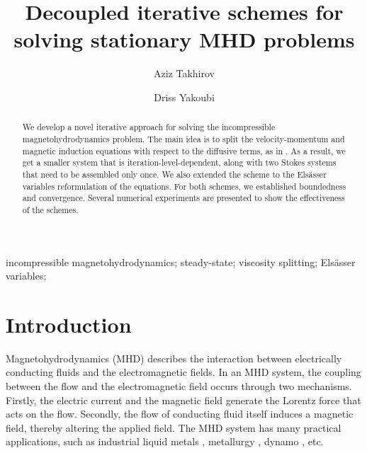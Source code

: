 \documentclass[3p]{elsarticle}
\begin{document}
\begin{frontmatter}

\title{Decoupled iterative schemes for solving stationary MHD problems} 

\author[labelA]{Aziz Takhirov} %
\address[labelA]{University of Sharjah, UAE}
\author[labelB]{Driss Yakoubi}%
\address[labelB]{De Vinci Higher Education, De Vinci Research Center, Paris, France.}

 
 


\begin{abstract}
We develop a novel iterative approach for solving the incompressible magnetohydrodynamics problem. The main idea is to split the velocity-momentum and magnetic induction equations with respect to the diffusive terms, as in \cite{Yak2023}. As a result, we get a smaller system that is iteration-level-dependent, along with two Stokes systems that need to be assembled only once. We also extended the scheme to the Els{\"a}sser variables reformulation of the equations. For both schemes, we established boundedness and convergence. Several numerical experiments are presented to show the effectiveness of the schemes.
\end{abstract}

\begin{keyword}
incompressible magnetohydrodynamics; steady-state; viscosity splitting; Els{\"a}sser variables;
\end{keyword}

\end{frontmatter}

\section{Introduction}\label{sec:Intro}
 Magnetohydrodynamics (MHD) describes the interaction between electrically conducting fluids and the electromagnetic fields. In an MHD system, the coupling between the flow and the electromagnetic field occurs through two mechanisms. Firstly, the electric current and the magnetic field generate the Lorentz force that acts on the flow. Secondly, the flow of conducting fluid itself induces a magnetic field, thereby altering the applied field. The MHD system has many practical applications, such as industrial liquid metals \cite{gerbeau2006mathematical}, metallurgy \cite{Davidson_2001}, dynamo \cite{Nore_2016}, etc.
 
\end{document}
